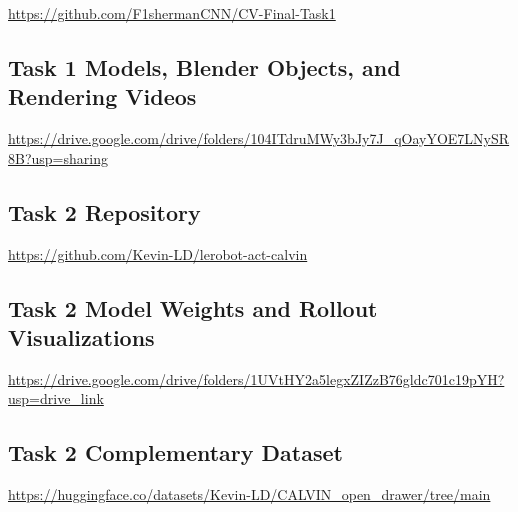 \documentclass{article}
\begin{document}
\url{https://github.com/F1shermanCNN/CV-Final-Task1}

\subsection{Task 1 Models, Blender Objects, and Rendering Videos}
\label{sec:models}
\url{https://drive.google.com/drive/folders/104ITdruMWy3bJy7J_qOayYOE7LNySR8B?usp=sharing}

\subsection{Task 2 Repository}

\url{https://github.com/Kevin-LD/lerobot-act-calvin}

\subsection{Task 2 Model Weights and Rollout Visualizations}

\url{https://drive.google.com/drive/folders/1UVtHY2a5legxZIZzB76gldc701c19pYH?usp=drive_link}

\subsection{Task 2 Complementary Dataset}

\url{https://huggingface.co/datasets/Kevin-LD/CALVIN_open_drawer/tree/main}

%
%
%
\end{document}
